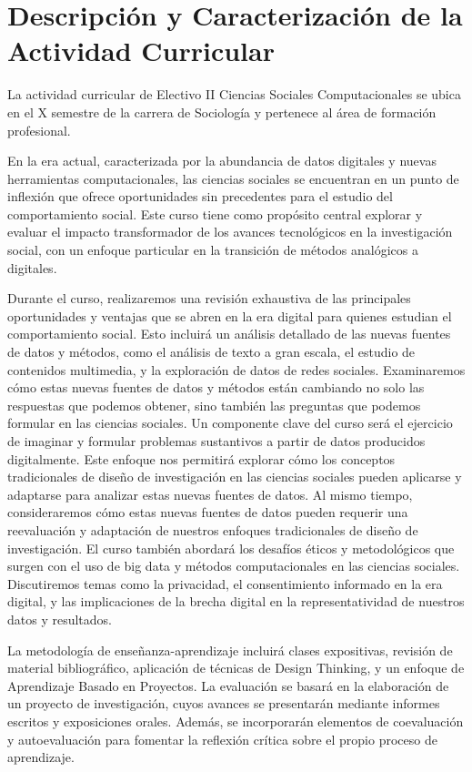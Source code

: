 \documentclass[11pt,letter,]{article}
\begin{document}
\hypertarget{descripciuxf3n-y-caracterizaciuxf3n-de-la-actividad-curricular}{%
\section{Descripción y Caracterización de la Actividad
Curricular}\label{descripciuxf3n-y-caracterizaciuxf3n-de-la-actividad-curricular}}

La actividad curricular de Electivo II Ciencias Sociales Computacionales
se ubica en el X semestre de la carrera de Sociología y pertenece al
área de formación profesional.

En la era actual, caracterizada por la abundancia de datos digitales y
nuevas herramientas computacionales, las ciencias sociales se encuentran
en un punto de inflexión que ofrece oportunidades sin precedentes para
el estudio del comportamiento social. Este curso tiene como propósito
central explorar y evaluar el impacto transformador de los avances
tecnológicos en la investigación social, con un enfoque particular en la
transición de métodos analógicos a digitales.

Durante el curso, realizaremos una revisión exhaustiva de las
principales oportunidades y ventajas que se abren en la era digital para
quienes estudian el comportamiento social. Esto incluirá un análisis
detallado de las nuevas fuentes de datos y métodos, como el análisis de
texto a gran escala, el estudio de contenidos multimedia, y la
exploración de datos de redes sociales. Examinaremos cómo estas nuevas
fuentes de datos y métodos están cambiando no solo las respuestas que
podemos obtener, sino también las preguntas que podemos formular en las
ciencias sociales. Un componente clave del curso será el ejercicio de
imaginar y formular problemas sustantivos a partir de datos producidos
digitalmente. Este enfoque nos permitirá explorar cómo los conceptos
tradicionales de diseño de investigación en las ciencias sociales pueden
aplicarse y adaptarse para analizar estas nuevas fuentes de datos. Al
mismo tiempo, consideraremos cómo estas nuevas fuentes de datos pueden
requerir una reevaluación y adaptación de nuestros enfoques
tradicionales de diseño de investigación. El curso también abordará los
desafíos éticos y metodológicos que surgen con el uso de big data y
métodos computacionales en las ciencias sociales. Discutiremos temas
como la privacidad, el consentimiento informado en la era digital, y las
implicaciones de la brecha digital en la representatividad de nuestros
datos y resultados.

La metodología de enseñanza-aprendizaje incluirá clases expositivas,
revisión de material bibliográfico, aplicación de técnicas de Design
Thinking, y un enfoque de Aprendizaje Basado en Proyectos. La evaluación
se basará en la elaboración de un proyecto de investigación, cuyos
avances se presentarán mediante informes escritos y exposiciones orales.
Además, se incorporarán elementos de coevaluación y autoevaluación para
fomentar la reflexión crítica sobre el propio proceso de aprendizaje.
\end{document}
